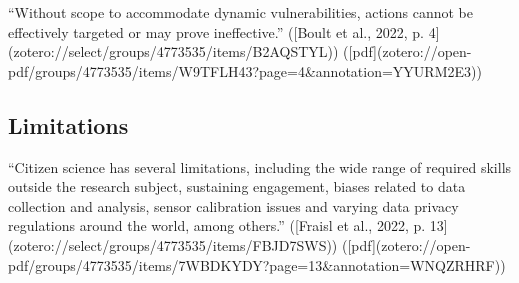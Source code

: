 “Without scope to accommodate dynamic vulnerabilities, actions cannot be effectively targeted or may prove ineffective.” ([Boult et al., 2022, p. 4](zotero://select/groups/4773535/items/B2AQSTYL)) ([pdf](zotero://open-pdf/groups/4773535/items/W9TFLH43?page=4&annotation=YYURM2E3))




\subsection{Limitations}
“Citizen science has several limitations, including the wide range of required skills outside the research subject, sustaining engagement, biases related to data collection and analysis, sensor calibration issues and varying data privacy regulations around the world, among others.” ([Fraisl et al., 2022, p. 13](zotero://select/groups/4773535/items/FBJD7SWS)) ([pdf](zotero://open-pdf/groups/4773535/items/7WBDKYDY?page=13&annotation=WNQZRHRF))

